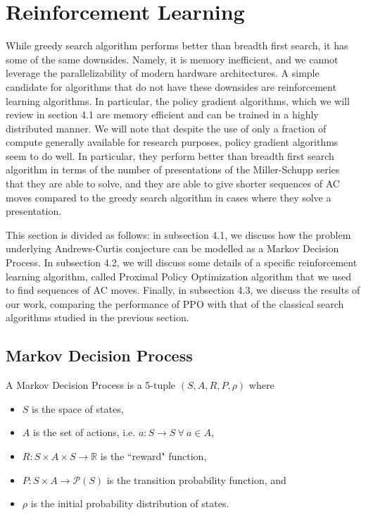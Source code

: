 
\section{Reinforcement Learning}

While greedy search algorithm performs better than breadth first search, it has some of the same downsides. Namely, it is memory inefficient, and we cannot leverage the parallelizability of modern hardware architectures. A simple candidate for algorithms that do not have these downsides are reinforcement learning algorithms. In particular, the policy gradient algorithms, which we will review in section 4.1 are memory efficient and can be trained in a highly distributed manner. We will note that despite the use of only a fraction of compute generally available for research purposes, policy gradient algorithms seem to do well. In particular, they perform better than breadth first search algorithm in terms of the number of presentations of the Miller-Schupp series that they are able to solve, and they are able to give shorter sequences of AC moves compared to the greedy search algorithm in cases where they solve a presentation. 

This section is divided as follows: in subsection 4.1, we discuss how the problem underlying Andrews-Curtis conjecture can be modelled as a Markov Decision Process. In subsection 4.2, we will discuss some details of a specific reinforcement learning algorithm, called Proximal Policy Optimization algorithm that we used to find sequences of AC moves. Finally, in subsection 4.3, we discuss the results of our work, comparing the performance of PPO with that of the classical search algorithms studied in the previous section. 

\subsection{Markov Decision Process}

A Markov Decision Process is a 5-tuple $(S, A, R, P, \rho)$ where 
\begin{itemize}
	\item $S$ is the space of states, 
	\item $A$ is the set of actions, i.e. $a \colon S \to S \ \forall \ a \in A$, 
	\item $R \colon S \times A \times S \to \mathbb{R}$ is the ``reward" function, 
	\item $P \colon S \times A \to \mathcal{P}(S)$ is the transition probability function, and 
	\item $\rho$ is the initial probability distribution of states. 
\end{itemize}

